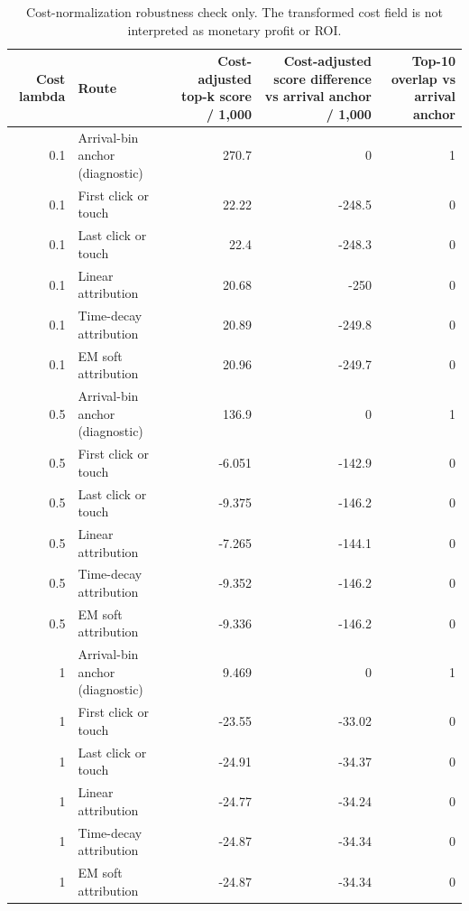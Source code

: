 \begin{table}
\caption{Cost-normalization robustness check only. The transformed cost field is not interpreted as monetary profit or ROI.}
\label{tab:app_exp2_cost_adjusted_credit_score}
\begin{tabular}{rlrrr}
\toprule
Cost lambda & Route & Cost-adjusted top-k score / 1,000 & Cost-adjusted score difference vs arrival anchor / 1,000 & Top-10 overlap vs arrival anchor \\
\midrule
0.1 & Arrival-bin anchor (diagnostic) & 270.7 & 0 & 1 \\
0.1 & First click or touch & 22.22 & -248.5 & 0 \\
0.1 & Last click or touch & 22.4 & -248.3 & 0 \\
0.1 & Linear attribution & 20.68 & -250 & 0 \\
0.1 & Time-decay attribution & 20.89 & -249.8 & 0 \\
0.1 & EM soft attribution & 20.96 & -249.7 & 0 \\
0.5 & Arrival-bin anchor (diagnostic) & 136.9 & 0 & 1 \\
0.5 & First click or touch & -6.051 & -142.9 & 0 \\
0.5 & Last click or touch & -9.375 & -146.2 & 0 \\
0.5 & Linear attribution & -7.265 & -144.1 & 0 \\
0.5 & Time-decay attribution & -9.352 & -146.2 & 0 \\
0.5 & EM soft attribution & -9.336 & -146.2 & 0 \\
1 & Arrival-bin anchor (diagnostic) & 9.469 & 0 & 1 \\
1 & First click or touch & -23.55 & -33.02 & 0 \\
1 & Last click or touch & -24.91 & -34.37 & 0 \\
1 & Linear attribution & -24.77 & -34.24 & 0 \\
1 & Time-decay attribution & -24.87 & -34.34 & 0 \\
1 & EM soft attribution & -24.87 & -34.34 & 0 \\
\bottomrule
\end{tabular}
\end{table}
